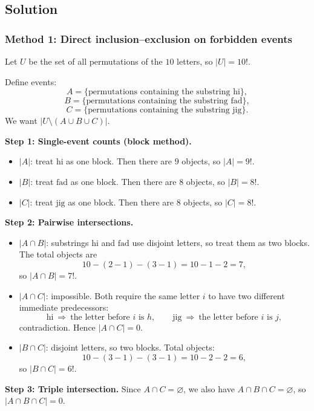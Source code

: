 \documentclass[12pt]{article}
\begin{document}
\subsection{Solution}

\subsubsection{Method 1: Direct inclusion--exclusion on forbidden events}
Let $U$ be the set of all permutations of the $10$ letters, so $|U|=10!$.

Define events:
\[
A=\{\text{permutations containing the substring }\text{hi}\},
\]
\[
B=\{\text{permutations containing the substring }\text{fad}\},
\]
\[
C=\{\text{permutations containing the substring }\text{jig}\}.
\]
We want $|U\setminus (A\cup B\cup C)|$.

\medskip
\noindent\textbf{Step 1: Single-event counts (block method).}
\begin{itemize}[leftmargin=*]
\item $|A|$: treat $\text{hi}$ as one block. Then there are $9$ objects, so $|A|=9!$.
\item $|B|$: treat $\text{fad}$ as one block. Then there are $8$ objects, so $|B|=8!$.
\item $|C|$: treat $\text{jig}$ as one block. Then there are $8$ objects, so $|C|=8!$.
\end{itemize}

\medskip
\noindent\textbf{Step 2: Pairwise intersections.}
\begin{itemize}[leftmargin=*]
\item $|A\cap B|$: substrings $\text{hi}$ and $\text{fad}$ use disjoint letters, so treat them as two blocks. The total objects are
\[
10 - (2-1) - (3-1) = 10-1-2=7,
\]
so $|A\cap B|=7!$.
\item $|A\cap C|$: impossible. Both require the same letter $i$ to have two different immediate predecessors:
\[
\text{hi}\ \Rightarrow\ \text{the letter before }i\text{ is }h,\qquad
\text{jig}\ \Rightarrow\ \text{the letter before }i\text{ is }j,
\]
contradiction. Hence $|A\cap C|=0$.
\item $|B\cap C|$: disjoint letters, so two blocks. Total objects:
\[
10-(3-1)-(3-1)=10-2-2=6,
\]
so $|B\cap C|=6!$.
\end{itemize}

\medskip
\noindent\textbf{Step 3: Triple intersection.}
Since $A\cap C=\varnothing$, we also have $A\cap B\cap C=\varnothing$, so $|A\cap B\cap C|=0$.
\end{document}
